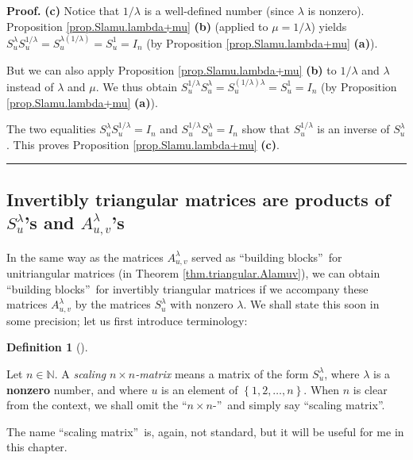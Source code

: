 \documentclass[numbers=enddot,12pt,final,onecolumn,notitlepage]{scrartcl}%
\theoremstyle{definition}
\newtheorem{defi}[theo]{Definition}
\newenvironment{definition}[1][]
{\begin{defi}[#1]\begin{leftbar}}
{\end{leftbar}\end{defi}}
\newenvironment{proof}[1][Proof]{\noindent\textbf{#1.} }{\ \rule{0.5em}{0.5em}}
\begin{document}
\begin{proof}
\textbf{(c)} Notice that $1/\lambda$ is a well-defined number (since $\lambda$
is nonzero). Proposition \ref{prop.Slamu.lambda+mu} \textbf{(b)} (applied to
$\mu=1/\lambda$) yields $S_{u}^{\lambda}S_{u}^{1/\lambda}=S_{u}^{\lambda
\left(  1/\lambda\right)  }=S_{u}^{1}=I_{n}$ (by Proposition
\ref{prop.Slamu.lambda+mu} \textbf{(a)}).

But we can also apply Proposition \ref{prop.Slamu.lambda+mu} \textbf{(b)} to
$1/\lambda$ and $\lambda$ instead of $\lambda$ and $\mu$. We thus obtain
$S_{u}^{1/\lambda}S_{u}^{\lambda}=S_{u}^{\left(  1/\lambda\right)  \lambda
}=S_{u}^{1}=I_{n}$ (by Proposition \ref{prop.Slamu.lambda+mu} \textbf{(a)}).

The two equalities $S_{u}^{\lambda}S_{u}^{1/\lambda}=I_{n}$ and $S_{u}%
^{1/\lambda}S_{u}^{\lambda}=I_{n}$ show that $S_{u}^{1/\lambda}$ is an inverse
of $S_{u}^{\lambda}$. This proves Proposition \ref{prop.Slamu.lambda+mu}
\textbf{(c)}.
\end{proof}

\subsection{Invertibly triangular matrices are products of $S_{u}^{\lambda}$'s
and $A_{u,v}^{\lambda}$'s}

In the same way as the matrices $A_{u,v}^{\lambda}$ served as
\textquotedblleft building blocks\textquotedblright\ for unitriangular
matrices (in Theorem \ref{thm.triangular.Alamuv}), we can obtain
\textquotedblleft building blocks\textquotedblright\ for invertibly triangular
matrices if we accompany these matrices $A_{u,v}^{\lambda}$ by the matrices
$S_{u}^{\lambda}$ with nonzero $\lambda$. We shall state this soon in some
precision; let us first introduce terminology:

\begin{definition}
\label{def.Slamu.scaling}Let $n\in\mathbb{N}$. A \textit{scaling }$n\times
n$\textit{-matrix} means a matrix of the form $S_{u}^{\lambda}$, where
$\lambda$ is a \textbf{nonzero} number, and where $u$ is an element of
$\left\{  1,2,\ldots,n\right\}  $. When $n$ is clear from the context, we
shall omit the \textquotedblleft$n\times n$-\textquotedblright\ and simply say
\textquotedblleft scaling matrix\textquotedblright.
\end{definition}

The name \textquotedblleft scaling matrix\textquotedblright\ is, again, not
standard, but it will be useful for me in this chapter.
\end{document}
